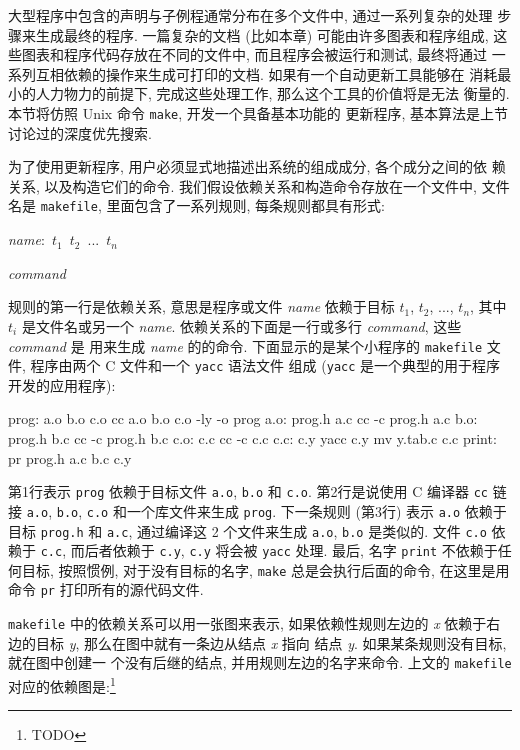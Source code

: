 大型程序中包含的声明与子例程通常分布在多个文件中, 通过一系列复杂的处理
步骤来生成最终的程序. 一篇复杂的文档 (比如本章) 可能由许多图表和程序组成,
这些图表和程序代码存放在不同的文件中, 而且程序会被运行和测试, 最终将通过
一系列互相依赖的操作来生成可打印的文档. 如果有一个自动更新工具能够在
消耗最小的人力物力的前提下, 完成这些处理工作, 那么这个工具的价值将是无法
衡量的. 本节将仿照 Unix 命令 \texttt{make}, 开发一个具备基本功能的
更新程序, 基本算法是上节讨论过的深度优先搜索.

为了使用更新程序, 用户必须显式地描述出系统的组成成分, 各个成分之间的依
赖关系, 以及构造它们的命令. 我们假设依赖关系和构造命令存放在一个文件中, 
文件名是 \texttt{makefile}, 里面包含了一系列规则, 每条规则都具有形式:
\begin{pattern}
    \indent\textit{name}:\texttt{    }$t_1$\ $t_2$\ ...\ $t_n$ \par 
    \indent\indent\textit{command}
\end{pattern}
规则的第一行是依赖关系, 意思是程序或文件 \textit{name} 依赖于目标
$t_1$, $t_2$, ..., $t_n$, 其中 $t_i$ 是文件名或另一个 \textit{name}.
依赖关系的下面是一行或多行 \textit{command}, 这些 \textit{command} 是
用来生成 \textit{name} 的的命令. 下面显示的是某个小程序的
\texttt{makefile} 文件, 程序由两个 C 文件和一个 \texttt{yacc} 语法文件
组成 (\texttt{yacc} 是一个典型的用于程序开发的应用程序):
\begin{file}
    prog:       a.o b.o c.o
                cc a.o b.o c.o -ly -o prog 
    a.o:        prog.h a.c
                cc -c prog.h a.c
    b.o:        prog.h b.c
                cc -c prog.h b.c
    c.o:        c.c
                cc -c c.c
    c.c:        c.y
                yacc c.y
                mv y.tab.c c.c
    print:
                pr prog.h a.c b.c c.y
\end{file}
第1行表示 \texttt{prog} 依赖于目标文件 \texttt{a.o}, \texttt{b.o} 和
\texttt{c.o}. 第2行是说使用 C 编译器 \texttt{cc} 链接 \texttt{a.o},
\texttt{b.o}, \texttt{c.o} 和一个库文件来生成 \texttt{prog}. 下一条规则
(第3行) 表示 \texttt{a.o} 依赖于目标 \texttt{prog.h} 和 \texttt{a.c},
通过编译这 2 个文件来生成 \texttt{a.o}, \texttt{b.o} 是类似的. 文件 
\texttt{c.o} 依赖于 \texttt{c.c}, 而后者依赖于 \texttt{c.y}, \texttt{c.y}
将会被 \texttt{yacc} 处理. 最后, 名字 \texttt{print} 不依赖于任何目标,
按照惯例, 对于没有目标的名字, \texttt{make} 总是会执行后面的命令,
在这里是用命令 \texttt{pr} 打印所有的源代码文件.

\texttt{makefile} 中的依赖关系可以用一张图来表示, 如果依赖性规则左边的
\textit{x} 依赖于右边的目标 \textit{y}, 那么在图中就有一条边从结点
\textit{x} 指向 结点 \textit{y}. 如果某条规则没有目标, 就在图中创建一
个没有后继的结点, 并用规则左边的名字来命令. 上文的 \texttt{makefile}
对应的依赖图是:\footnote{TODO}

